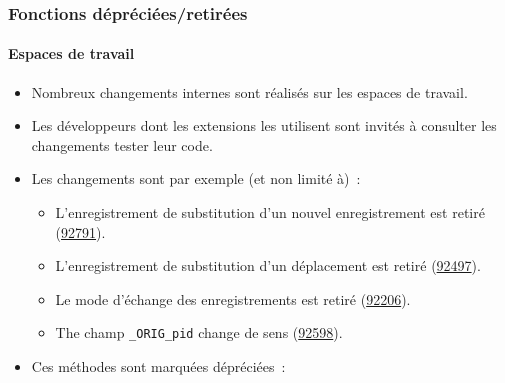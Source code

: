 %

\begin{frame}[fragile]
	\frametitle{Fonctions dépréciées/retirées}
	\framesubtitle{Espaces de travail}

	\begin{itemize}
		\item Nombreux changements internes sont réalisés sur les espaces de travail.
		\item Les développeurs dont les extensions les utilisent sont invités à consulter les changements
			tester leur code.
		\item Les changements sont par exemple (et non limité à)~:

			\begin{itemize}\small
				\item L'enregistrement de substitution d'un nouvel enregistrement est retiré
					(\href{https://docs.typo3.org/c/typo3/cms-core/master/en-us/Changelog/11.0/Breaking-92791-NewPlaceholderRecordsRemovedInWorkspaces.html}{92791}).
				\item L'enregistrement de substitution d'un déplacement est retiré
					(\href{https://docs.typo3.org/c/typo3/cms-core/master/en-us/Changelog/11.0/Breaking-92497-WorkspacesMovePlaceholdersRemoved.html}{92497}).
				\item Le mode d'échange des enregistrements est retiré
					(\href{https://docs.typo3.org/c/typo3/cms-core/master/en-us/Changelog/11.0/Breaking-92206-RemoveWorkspaceSwappingOfElements.html}{92206}).
				\item The champ \texttt{\_ORIG\_pid} change de sens
					(\href{https://docs.typo3.org/c/typo3/cms-core/master/en-us/Changelog/11.0/Breaking-92598-Workspace-overlaysAuto-fixThePIDValueForMovedRecords.html}{92598}).
			\end{itemize}

		\item Ces méthodes sont marquées dépréciées~:


\end{itemize}
\end{frame}
